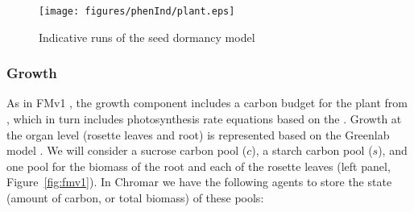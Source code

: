 \begin{figure}[tb]
  \centering
  \texttt{[image: figures/phenInd/plant.eps]}
  \caption{Indicative runs of the seed dormancy model}
  \label{fig:vegInd}
\end{figure}



\subsubsection*{Growth}
As in FMv1 \citep{chew_multiscale_2014}, the growth component includes a carbon
budget for the plant from \citet{rasse_leaf_2006}, which in turn includes
photosynthesis rate equations based on the \citet{farquhar_biochemical_1980}
. Growth at the organ level (rosette leaves and root) is represented based on
the Greenlab model \citep{christophe_model-based_2008}. We will consider a
sucrose carbon pool (\(c\)), a starch carbon pool (\(s\)), and one pool for the
biomass of the root and each of the rosette leaves (left panel, Figure~\ref{fig:fmv1}). In
Chromar we have the following agents to store the state (amount of carbon, or
total biomass) of these pools:
